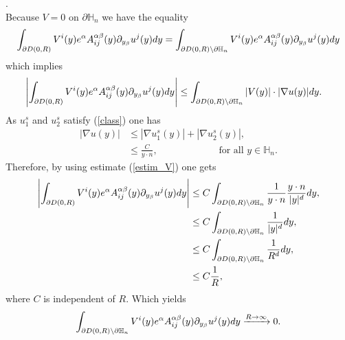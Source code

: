 \documentclass[11pt, reqno]{amsart}
\theoremstyle{definition}
\theoremstyle{remark}
\numberwithin{equation}{section}
\newcommand{\bs}{\symbol{92}}
\begin{document}
\begin{appendices}
		.\\		
		Because $V=0$ on  $\partial\mathbb{H}_n $   we have the equality 
		\begin{align*}
			\int_{  \partial D(0,R)  }  V^i(y)e^\alpha A^{\alpha\beta}_{ij}(y) \partial_{y_\beta} u^j(y)  dy= \int_{  \partial D(0,R) \bs \partial\mathbb{H}_n}   V^i(y)e^\alpha A^{\alpha\beta}_{ij}(y) \partial_{y_\beta} u^j(y) dy
		\end{align*}
		which implies 
			\begin{align*}
			\left|\int_{  \partial D(0,R)}   V^i(y)e^\alpha A^{\alpha\beta}_{ij}(y) \partial_{y_\beta} u^j(y)  dy \right| 
			&\leq \int_{  \partial D(0,R)  \bs \partial\mathbb{H}_n  } | V (y)|\cdot  |\nabla u(y)|  dy.
		\end{align*}
	As $u^s_1$ and $u^s_2$ satisfy (\ref{class}) one has
		\begin{align*}
			|\nabla u(y)| &\leq |\nabla u^s_1(y)| + |\nabla u^s_2(y)|,    \\
			&\leq   \frac{C}{y\cdot n}, \qquad    \qquad   \qquad \mbox{ for all } y\in\mathbb{H}_n .
		\end{align*}
		Therefore, by using estimate (\ref{estim_V}) one gets
		\begin{align*}
			\left|\int_{  \partial D(0,R)}   V^i(y)e^\alpha A^{\alpha\beta}_{ij}(y) \partial_{y_\beta} u^j(y)  dy \right| 
			&\leq C \int_{\partial D(0,R) \bs \partial\mathbb{H}_n }    \frac{1}{y\cdot n} \frac{y\cdot n}{|y|^d}dy,\\
			&\leq C \int_{ \partial D(0,R) \bs \partial\mathbb{H}_n }    \frac{1}{|y|^d}dy,\\
			&\leq C \int_{ \partial D(0,R) \bs \partial\mathbb{H}_n  }    \frac{1}{R^{d}}dy,\\
			&\leq C  \frac{1}{R},
		\end{align*}
		where $C$ is independent of $R$. Which yields 
		\begin{align*}
			\int_{  \partial D(0,R) \bs \partial\mathbb{H}_n  }    V^i(y)e^\alpha A^{\alpha\beta}_{ij}(y) \partial_{y_\beta} u^j(y)dy  \xrightarrow[]{R\rightarrow\infty} 0.\\
		\end{align*}
		

\end{appendices}
\end{document}
